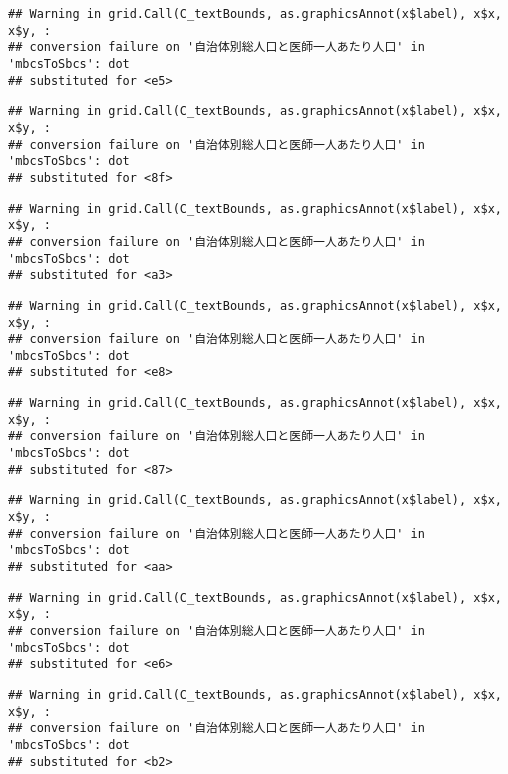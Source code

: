 \documentclass[
]{article}
\begin{document}
\begin{verbatim}
## Warning in grid.Call(C_textBounds, as.graphicsAnnot(x$label), x$x, x$y, :
## conversion failure on '自治体別総人口と医師一人あたり人口' in 'mbcsToSbcs': dot
## substituted for <e5>
\end{verbatim}

\begin{verbatim}
## Warning in grid.Call(C_textBounds, as.graphicsAnnot(x$label), x$x, x$y, :
## conversion failure on '自治体別総人口と医師一人あたり人口' in 'mbcsToSbcs': dot
## substituted for <8f>
\end{verbatim}

\begin{verbatim}
## Warning in grid.Call(C_textBounds, as.graphicsAnnot(x$label), x$x, x$y, :
## conversion failure on '自治体別総人口と医師一人あたり人口' in 'mbcsToSbcs': dot
## substituted for <a3>
\end{verbatim}

\begin{verbatim}
## Warning in grid.Call(C_textBounds, as.graphicsAnnot(x$label), x$x, x$y, :
## conversion failure on '自治体別総人口と医師一人あたり人口' in 'mbcsToSbcs': dot
## substituted for <e8>
\end{verbatim}

\begin{verbatim}
## Warning in grid.Call(C_textBounds, as.graphicsAnnot(x$label), x$x, x$y, :
## conversion failure on '自治体別総人口と医師一人あたり人口' in 'mbcsToSbcs': dot
## substituted for <87>
\end{verbatim}

\begin{verbatim}
## Warning in grid.Call(C_textBounds, as.graphicsAnnot(x$label), x$x, x$y, :
## conversion failure on '自治体別総人口と医師一人あたり人口' in 'mbcsToSbcs': dot
## substituted for <aa>
\end{verbatim}

\begin{verbatim}
## Warning in grid.Call(C_textBounds, as.graphicsAnnot(x$label), x$x, x$y, :
## conversion failure on '自治体別総人口と医師一人あたり人口' in 'mbcsToSbcs': dot
## substituted for <e6>
\end{verbatim}

\begin{verbatim}
## Warning in grid.Call(C_textBounds, as.graphicsAnnot(x$label), x$x, x$y, :
## conversion failure on '自治体別総人口と医師一人あたり人口' in 'mbcsToSbcs': dot
## substituted for <b2>
\end{verbatim}
\end{document}
